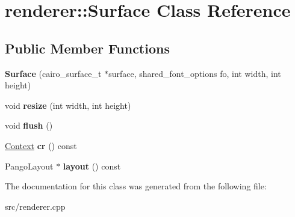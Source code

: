 \hypertarget{classrenderer_1_1Surface}{}\section{renderer\+::Surface Class Reference}
\label{classrenderer_1_1Surface}
\subsection*{Public Member Functions}
\begin{DoxyCompactItemize}
\item 
\mbox{\label{classrenderer_1_1Surface_a78ba3576dfb6c47376a043d4447ca16e}} 
{\bfseries Surface} (cairo\+\_\+surface\+\_\+t $\ast$surface, shared\+\_\+font\+\_\+options fo, int width, int height)
\item 
\mbox{\label{classrenderer_1_1Surface_a667f13b5a24d2a881032614c4fa5165a}} 
void {\bfseries resize} (int width, int height)
\item 
\mbox{\label{classrenderer_1_1Surface_a55d5caa4fd156c6b210b9f1c3a35653e}} 
void {\bfseries flush} ()
\item 
\mbox{\label{classrenderer_1_1Surface_a5fa99e059452f84be4490d57c9ff70d6}} 
\mbox{\hyperlink{classrenderer_1_1Context}{Context}} {\bfseries cr} () const
\item 
\mbox{\label{classrenderer_1_1Surface_aa84da7a7984bdc1a4395eccf6f92248c}} 
Pango\+Layout $\ast$ {\bfseries layout} () const
\end{DoxyCompactItemize}


The documentation for this class was generated from the following file\+:\begin{DoxyCompactItemize}
\item 
src/renderer.\+cpp\end{DoxyCompactItemize}

